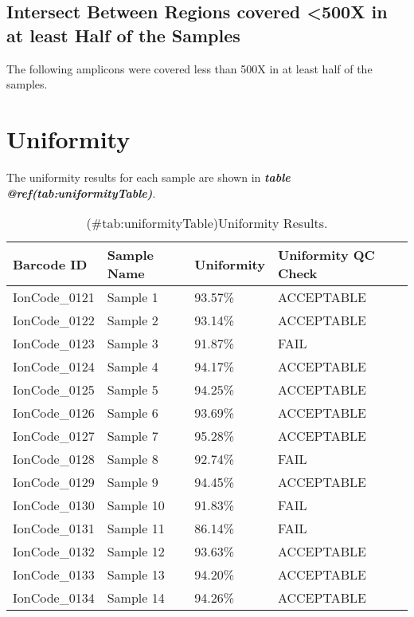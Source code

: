 \documentclass[
]{article}
\newenvironment{Shaded}{}{}
\newcommand{\NormalTok}[1]{#1}
\begin{document}
\hypertarget{intersect-between-regions-covered-500x-in-at-least-half-of-the-samples}{%
\subsection{Intersect Between Regions covered \textless500X in at least Half of the Samples}\label{intersect-between-regions-covered-500x-in-at-least-half-of-the-samples}}

The following amplicons were covered less than 500X in at least half of the samples.

\begin{Shaded}
\end{Shaded}

\newpage

\hypertarget{uniformity}{%
\section{Uniformity}\label{uniformity}}

The uniformity results for each sample are shown in \textbf{\emph{table @ref(tab:uniformityTable)}}.

\begin{longtable}[t]{llll}
\caption{(\#tab:uniformityTable)Uniformity Results.}\\
\toprule
Barcode ID & Sample Name & Uniformity & Uniformity QC Check\\
\midrule
IonCode\_0121 & Sample 1 & 93.57\% & ACCEPTABLE\\
IonCode\_0122 & Sample 2 & 93.14\% & ACCEPTABLE\\
IonCode\_0123 & Sample 3 & 91.87\% & FAIL\\
IonCode\_0124 & Sample 4 & 94.17\% & ACCEPTABLE\\
IonCode\_0125 & Sample 5 & 94.25\% & ACCEPTABLE\\
\addlinespace
IonCode\_0126 & Sample 6 & 93.69\% & ACCEPTABLE\\
IonCode\_0127 & Sample 7 & 95.28\% & ACCEPTABLE\\
IonCode\_0128 & Sample 8 & 92.74\% & FAIL\\
IonCode\_0129 & Sample 9 & 94.45\% & ACCEPTABLE\\
IonCode\_0130 & Sample 10 & 91.83\% & FAIL\\
\addlinespace
IonCode\_0131 & Sample 11 & 86.14\% & FAIL\\
IonCode\_0132 & Sample 12 & 93.63\% & ACCEPTABLE\\
IonCode\_0133 & Sample 13 & 94.20\% & ACCEPTABLE\\
IonCode\_0134 & Sample 14 & 94.26\% & ACCEPTABLE\\
\bottomrule
\end{longtable}
\end{document}
